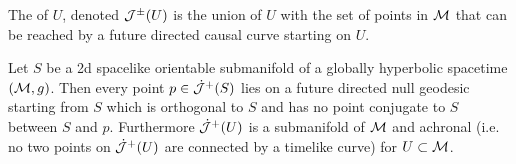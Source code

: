 \documentclass{article}
\begin{document}
\begin{definition}
The  of $U$, denoted $\mathcal{J}^\pm(U)$ is the union of $U$ with the set of points in $\mathcal{M}$ that can be reached by a future directed causal curve starting on $U$. 
\end{definition}

\begin{theorem}\label{thm:BH:2}
Let $S$ be a 2d spacelike orientable submanifold of a globally hyperbolic spacetime $(\mathcal{M},g)$. Then every point $p \in \dot{\mathcal{J}}^+ (S)$ lies on a future directed null geodesic starting from $S$ which is orthogonal to $S$ and has no point conjugate to $S$ between $S$ and $p$. Furthermore $\dot{\mathcal{J}}^+(U)$  is a submanifold of $\mathcal{M}$ and achronal (i.e. no two points on $\dot{\mathcal{J}}^+(U)$ are connected by a timelike curve) for $U\subset \mathcal{M}$. 
\end{theorem}
\end{document}
